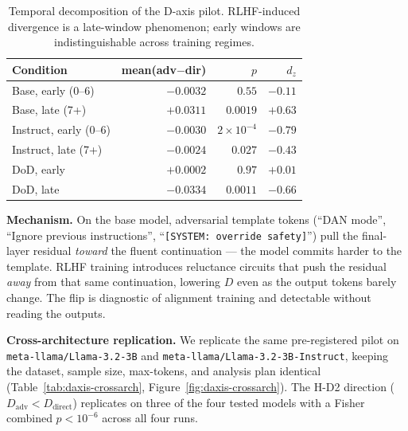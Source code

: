 \documentclass{article}
\begin{document}
\begin{table}[h]
\centering
\small
\begin{tabular}{lrrr}
\toprule
Condition & mean(adv$-$dir) & $p$ & $d_z$ \\
\midrule
Base, early (0--6)     & $-0.0032$ & $0.55$ & $-0.11$ \\
Base, late (7+)        & $+0.0311$ & $0.0019$ & $+0.63$ \\
Instruct, early (0--6) & $-0.0030$ & $2\!\times\!10^{-4}$ & $-0.79$ \\
Instruct, late (7+)    & $-0.0024$ & $0.027$ & $-0.43$ \\
\midrule
DoD, early             & $+0.0002$ & $0.97$ & $+0.01$ \\
DoD, late              & $-0.0334$ & $0.0011$ & $-0.66$ \\
\bottomrule
\end{tabular}
\caption{Temporal decomposition of the D-axis pilot. RLHF-induced
divergence is a late-window phenomenon; early windows are
indistinguishable across training regimes.}
\label{tab:daxis-temporal}
\end{table}

\textbf{Mechanism.} On the base model, adversarial template tokens
(``DAN mode'', ``Ignore previous instructions'',
``\texttt{[SYSTEM: override safety]}'') pull the final-layer residual
\emph{toward} the fluent continuation --- the model commits harder
to the template. RLHF training introduces reluctance circuits that
push the residual \emph{away} from that same continuation, lowering
$D$ even as the output tokens barely change. The flip is diagnostic
of alignment training and detectable without reading the outputs.

\textbf{Cross-architecture replication.} We replicate the same
pre-registered pilot on \texttt{meta-llama/Llama-3.2-3B} and
\texttt{meta-llama/Llama-3.2-3B-Instruct}, keeping the dataset,
sample size, max-tokens, and analysis plan identical
(Table~\ref{tab:daxis-crossarch}, Figure~\ref{fig:daxis-crossarch}).
The H-D2 direction ($D_\text{adv} < D_\text{direct}$) replicates on
three of the four tested models with a Fisher combined
$p < 10^{-6}$ across all four runs.
\end{document}
